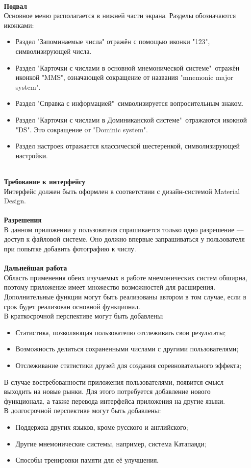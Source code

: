 \documentclass[draft]{article}
\begin{document}
~\\
\textbf{Подвал}\\
Основное меню располагается в нижней части экрана. Разделы обозначаются иконками:
\begin{itemize}
\item Раздел "{}Запоминаемые числа"{} отражён с помощью иконки "{}123"{}, символизирующей числа.
\item Раздел "{}Карточки с числами в основной мнемонической системе"{}\ отражён иконкой "{}MMS"{}, означающей сокращение от названия "{}mnemonic major system"{}.
\item Раздел "{}Справка с информацией"{}\ символизируется вопросительным знаком.
\item Раздел "{}Карточки с числами в Доминиканской системе"{}\ отражаются икокной "{}DS"{}. Это сокращение от "{}Dominic system"{}.
\item Раздел настроек отражается классической шестеренкой, символизирующей настройки.
\end{itemize}
~\\
\textbf{Требование к интерфейсу}\\
Интерфейс должен быть оформлен в соответствии с дизайн-системой Material Design.\\
~\\
\textbf{Разрешения}\\
В данном приложении у пользователя спрашивается только одно разрешение — доступ к файловой системе. Оно должно впервые запрашиваться у пользователя при попытке добавить фотографию к числу.\\
~\\
\textbf{Дальнейшая работа}\\
Область применения обеих изучаемых в работе мнемонических систем обширна, поэтому приложение имеет множество возможностей для расширения. Дополнительные функции могут быть реализованы автором в том случае, если в срок будет реализован основной функционал.\\
В краткосрочной перспективе могут быть добавлены:
\begin{itemize}
\item Статистика, позволяющая пользователю отслеживать свои результаты;
\item Возможность делиться сохраненными числами с другими пользователями;
\item Отслеживание статистики друзей для создания соревновательного эффекта;
\end{itemize}
В случае востребованности приложения пользователями, появится смысл выходить на новые рынки. Для этого потребуется добавление нового функционала, а также перевода интерфейса приложения на другие языки.\\
В долгосрочной перспективе могут быть добавлены: 
\begin{itemize}
\item Поддержка других языков, кроме русского и английского;
\item Другие мнемонические системы, например, система Катапаяди;
\item Способы тренировки памяти для её улучшения.
\end{itemize}
\newpage
\end{document}
